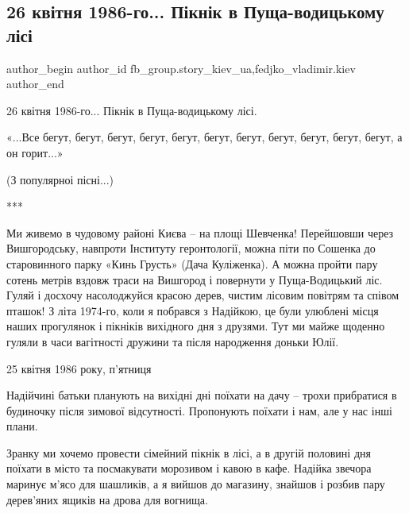  
 
 
 
 
 
\subsection{26 квітня 1986-го... Пікнік в Пуща-водицькому лісі}
\label{sec:30_11_2021.fb.fb_group.story_kiev_ua.1.chaes_piknik_puscha_vodica}
 
\ifcmt
 author_begin
   author_id fb_group.story_kiev_ua,fedjko_vladimir.kiev
 author_end
\fi

26 квітня 1986-го... Пікнік в Пуща-водицькому лісі.

«...Все бегут, бегут, бегут, бегут, бегут, бегут, бегут, бегут, бегут, бегут, бегут, 
а он горит...»

(З популярноі пісні...)

***

Ми живемо в чудовому районі Києва – на площі Шевченка! Перейшовши через
Вишгородську, навпроти Інституту геронтології, можна піти по Сошенка до
старовинного парку «Кинь Грусть» (Дача Куліженка). А можна пройти пару сотень
метрів вздовж траси на Вишгород і повернути у Пуща-Водицький ліс. Гуляй і
досхочу насолоджуйся красою дерев, чистим лісовим повітрям та співом пташок! З
літа 1974-го, коли я побрався з Надійкою, це були улюблені місця наших
прогулянок і пікніків вихідного дня з друзями. Тут ми майже щоденно гуляли в
часи вагітності дружини та після народження доньки Юлії. 

25 квітня 1986 року, п’ятниця

Надійчині батьки планують на вихідні дні поїхати на дачу – трохи прибратися в
будиночку після зимової відсутності. Пропонують поїхати і нам, але у нас інші
плани.  

Зранку ми хочемо провести сімейний пікнік в лісі, а в другій половині дня
поїхати в місто та посмакувати морозивом і кавою в кафе. Надійка звечора
маринує м’ясо для шашликів, а я вийшов до магазину, знайшов і розбив пару
дерев’яних ящиків на дрова для вогнища. 

